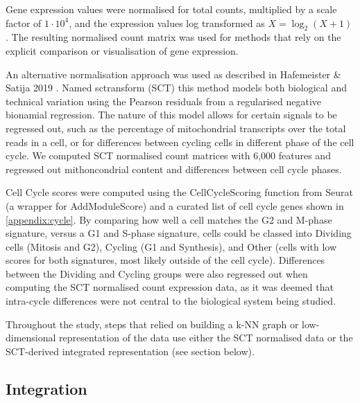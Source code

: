 Gene expression values were normalised for total counts, multiplied by a scale factor of  \(1\cdot10^4\), and the expression values log transformed as \(X = \log_2 (X+1)\). The resulting normalised count matrix was used for methods that rely on the explicit comparison or visualisation of gene expression.

An alternative normalisation approach was used as described in Hafemeister \& Satija 2019 \cite{hafemeister_normalization_2019}. Named sctransform (SCT) this method models both biological and technical variation using the Pearson residuals from a regularised negative bionamial regression. The nature of this model allows for certain signals to be regressed out, such as the percentage of mitochondrial transcripts over the total reads in a cell, or for differences between cycling cells in different phase of the cell cycle. We computed SCT normalised count matrices with 6,000 features and regressed out mithoncondrial content and differences between cell cycle phases.

Cell Cycle scores were computed using the CellCycleScoring function from Seurat (a wrapper for AddModuleScore) and a curated list of cell cycle genes shown in \ref{appendix:cycle}. By comparing how well a cell matches the G2 and M-phase signature, versus a G1 and S-phase signature, cells could be classed into Dividing cells (Mitosis and G2), Cycling (G1 and Synthesis), and Other (cells with low scores for both signatures, most likely outside of the cell cycle). Differences between the Dividing and Cycling groups were also regressed out when computing the SCT normalised count expression data, as it was deemed that intra-cycle differences were not central to the biological system being studied.

Throughout the study, steps that relied on building a k-NN graph or low-dimensional representation of the data use either the SCT normalised data or the SCT-derived integrated representation (see section below).

\subsection*{Integration}

